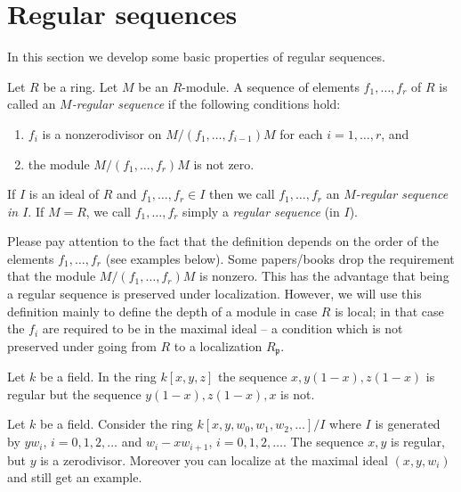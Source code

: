 \section{Regular sequences}
\label{section-regular-sequences}

\noindent
In this section we develop some basic properties of regular sequences.

\begin{definition}
\label{definition-regular-sequence}
Let $R$ be a ring. Let $M$ be an $R$-module. A sequence of elements
$f_1, \ldots, f_r$ of $R$ is called an {\it $M$-regular sequence}
if the following conditions hold:
\begin{enumerate}
\item $f_i$ is a nonzerodivisor on
$M/(f_1, \ldots, f_{i - 1})M$
for each $i = 1, \ldots, r$, and
\item the module $M/(f_1, \ldots, f_r)M$ is not zero.
\end{enumerate}
If $I$ is an ideal of $R$ and $f_1, \ldots, f_r \in I$
then we call $f_1, \ldots, f_r$ an {\it $M$-regular sequence
in $I$}. If $M = R$, we call $f_1, \ldots, f_r$ simply a
{\it regular sequence} (in $I$).
\end{definition}

\noindent
Please pay attention to the fact that the definition depends on the order
of the elements $f_1, \ldots, f_r$ (see examples below). Some papers/books
drop the requirement that the module $M/(f_1, \ldots, f_r)M$ is nonzero.
This has the advantage that being a regular sequence is preserved under
localization. However, we will use this definition mainly to define the
depth of a module in case $R$ is local; in that case the $f_i$ are required
to be in the maximal ideal -- a condition which is not preserved under going
from $R$ to a localization $R_\mathfrak p$.

\begin{example}
\label{example-global-regular}
Let $k$ be a field. In the ring $k[x, y, z]$
the sequence $x, y(1-x), z(1-x)$ is regular
but the sequence $y(1-x), z(1-x), x$ is not.
\end{example}

\begin{example}
\label{example-local-regular}
Let $k$ be a field. Consider the ring
$k[x, y, w_0, w_1, w_2, \ldots]/I$
where $I$ is generated by $yw_i$, $i = 0, 1, 2, \ldots$ and
$w_i - xw_{i + 1}$, $i = 0, 1, 2, \ldots$.
The sequence $x, y$ is regular, but $y$ is a zerodivisor.
Moreover you can localize at the maximal ideal
$(x, y, w_i)$ and still get an example.
\end{example}

